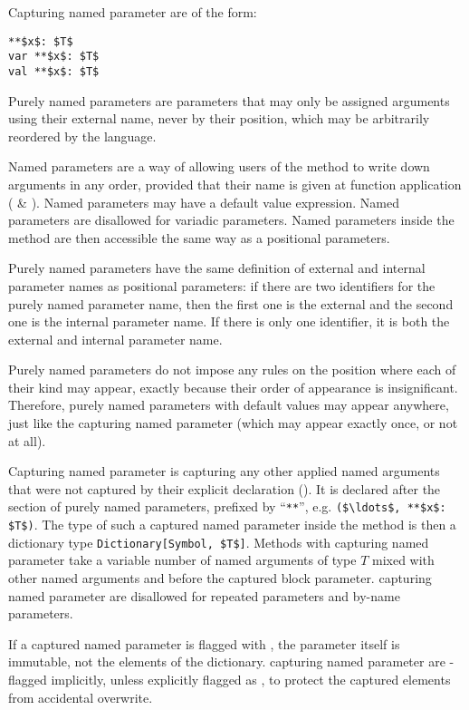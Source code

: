 Capturing named parameter are of the form: 
\begin{lstlisting}
**$x$: $T$
var **$x$: $T$
val **$x$: $T$
\end{lstlisting}

Purely named parameters are parameters that may only be assigned arguments using their external name, never by their position, which may be arbitrarily reordered by the language. 

Named parameters are a way of allowing users of the method to write down arguments in any order, provided that their name is given at function application ( \& ). Named parameters may have a default value expression. Named parameters are disallowed for variadic parameters. Named parameters inside the method are then accessible the same way as a positional parameters. 

Purely named parameters have the same definition of external and internal parameter names as positional parameters: if there are two identifiers for the purely named parameter name, then the first one is the external and the second one is the internal parameter name. If there is only one identifier, it is both the external and internal parameter name. 

Purely named parameters do not impose any rules on the position where each of their kind may appear, exactly because their order of appearance is insignificant. Therefore, purely named parameters with default values may appear anywhere, just like the capturing named parameter (which may appear exactly once, or not at all). 

Capturing named parameter is capturing any other applied named arguments that were not captured by their explicit declaration (). It is declared after the section of purely named parameters, prefixed by ``\lstinline!**!'', e.g. \lstinline!($\ldots$, **$x$: $T$)!. The type of such a captured named parameter inside the method is then a dictionary type \lstinline!Dictionary[Symbol, $T$]!. Methods with capturing named parameter take a variable number of named arguments of type $T$ mixed with other named arguments and before the captured block parameter. capturing named parameter are disallowed for repeated parameters and by-name parameters. 

If a captured named parameter is flagged with , the parameter itself is immutable, not the elements of the dictionary. capturing named parameter are -flagged implicitly, unless explicitly flagged as , to protect the captured elements from accidental overwrite. 

